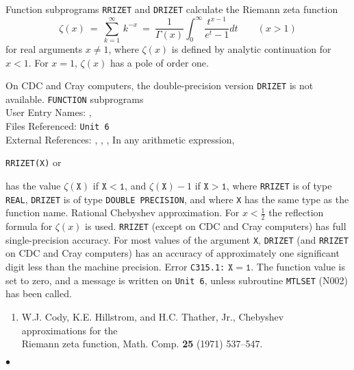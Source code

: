                        
                 
\Submitter{}                           
Function subprograms {\tt RRIZET} and {\tt DRIZET}
calculate the Riemann zeta function
$$ \zeta(x) \ = \ \displaystyle \sum_{k=1}^\infty \, k^{-x} \ = \
\displaystyle \frac{1}{\Gamma(x)} \int_0^\infty
\frac{t^{x-1}}{e^{t}-1} dt \qquad (x > 1) $$
for real arguments $x \neq 1$, where $\zeta(x)$ is defined by analytic
continuation for $x < 1$. For $x = 1$, $\zeta(x)$ has a pole of order
one.
\par
On CDC and Cray computers, the double-precision version
{\tt DRIZET} is not available.
\Structure
{\tt FUNCTION} subprograms\\
User Entry Names: , \\
Files Referenced: {\tt Unit 6} \\
External References: , ,
, 
\Usage
In any arithmetic expression,
\begin{center}
{\tt RRIZET(X)} \quad or  \quad
\end{center}
has the value $\zeta(\mathtt{X})$ if $\mathtt{X < 1}$, and
$\zeta(\mathtt{X})-1$ if $\mathtt{X > 1}$,
where {\tt RRIZET} is of type {\tt REAL}, {\tt DRIZET} is of type
{\tt DOUBLE PRECISION}, and where {\tt X} has the same type as the
function name.
\Method
Rational Chebyshev approximation. For $x < \frac{1}{2}$ the
reflection formula for $\zeta(x)$ is used.
\Accuracy
{\tt RRIZET} (except on CDC and Cray computers)
has full single-precision accuracy.
For most values of the argument {\tt X}, {\tt DRIZET}
(and {\tt RRIZET} on CDC and Cray computers) has an accuracy of
approximately one significant digit less than the machine precision.
\Errorh
Error {\tt C315.1:} $\mathtt{X = 1}$. The function value is set
to zero, and a message is written on {\tt Unit 6},
unless subroutine {\tt MTLSET} (N002) has been called.
\Refer
\begin{enumerate}
\item W.J. Cody, K.E. Hillstrom, and H.C. Thather, Jr., Chebyshev
approximations for the \\
Riemann zeta function, Math. Comp. {\bf 25} (1971) 537--547.
\end{enumerate}
$\bullet$
